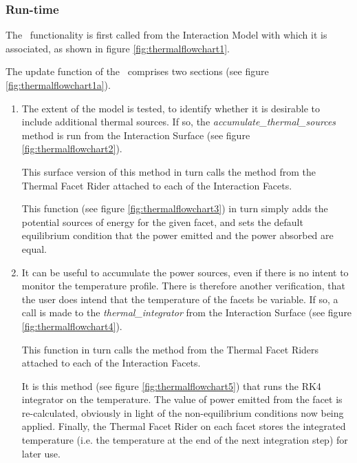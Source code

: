 \subsubsection{Run-time}

The \ThermalRiderDesc\ functionality is first called from the Interaction Model with
which it is associated, as shown in figure \vref{fig:thermalflowchart1}.

The update function of the \ThermalRiderDesc\ comprises two sections (see
figure \vref{fig:thermalflowchart1a}).
\begin{enumerate}
\item The extent of the model is tested, to identify whether it is desirable to include additional thermal sources.  If so, the \textit{accumulate\_thermal\_sources} method is run from the Interaction Surface (see figure \vref{fig:thermalflowchart2}).

This surface version of this method in turn calls the
method from the Thermal Facet Rider attached to each of the Interaction Facets.

This function (see figure \vref{fig:thermalflowchart3}) in turn simply adds the potential sources of energy for the given facet, and sets the default equilibrium condition that the power emitted and the power absorbed are equal.

\item  It can be useful to accumulate the power sources, even if there is no intent to monitor the temperature profile.  There is therefore another verification, that the user does intend that the temperature of the facets be variable.  If so, a call is made to the \textit{thermal\_integrator} from the Interaction Surface (see figure \vref{fig:thermalflowchart4}).

This function in turn 
calls the  method from the
Thermal Facet Riders attached to each of the Interaction Facets.

It is this method (see figure \vref{fig:thermalflowchart5}) that runs the 
RK4 integrator on the temperature.  The value of power emitted from the facet 
is re-calculated, obviously in light of the non-equilibrium conditions now being 
applied.  Finally, the Thermal Facet Rider on each facet stores the
integrated temperature (i.e. the temperature at the end of the next 
integration step) for later use.
\end{enumerate}



